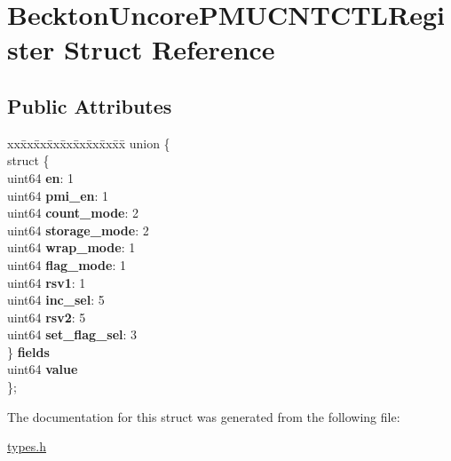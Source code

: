 \hypertarget{struct_beckton_uncore_p_m_u_c_n_t_c_t_l_register}{}\section{Beckton\+Uncore\+P\+M\+U\+C\+N\+T\+C\+T\+L\+Register Struct Reference}
\label{struct_beckton_uncore_p_m_u_c_n_t_c_t_l_register}
\subsection*{Public Attributes}
\begin{DoxyCompactItemize}
\item 
\mbox{\label{struct_beckton_uncore_p_m_u_c_n_t_c_t_l_register_afd9e4fd027a5b7ef046f36681f1d3f1f}} 
\begin{tabbing}
xx\=xx\=xx\=xx\=xx\=xx\=xx\=xx\=xx\=\kill
union \{\\
\>struct \{\\
\>\>uint64 {\bfseries en}: 1\\
\>\>uint64 {\bfseries pmi\_en}: 1\\
\>\>uint64 {\bfseries count\_mode}: 2\\
\>\>uint64 {\bfseries storage\_mode}: 2\\
\>\>uint64 {\bfseries wrap\_mode}: 1\\
\>\>uint64 {\bfseries flag\_mode}: 1\\
\>\>uint64 {\bfseries rsv1}: 1\\
\>\>uint64 {\bfseries inc\_sel}: 5\\
\>\>uint64 {\bfseries rsv2}: 5\\
\>\>uint64 {\bfseries set\_flag\_sel}: 3\\
\>\} {\bfseries fields}\\
\>uint64 {\bfseries value}\\
\}; \\

\end{tabbing}\end{DoxyCompactItemize}


The documentation for this struct was generated from the following file\+:\begin{DoxyCompactItemize}
\item 
\mbox{\hyperlink{types_8h}{types.\+h}}\end{DoxyCompactItemize}
